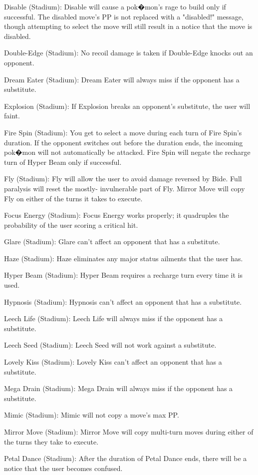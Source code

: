 \documentclass[reprint, aps, prl, paper=A4]{revtex4-1}
\begin{document}
Disable (Stadium):
Disable will cause a pok�mon's rage to build only if successful. The disabled move's PP is not
replaced with a "disabled!" message, though attempting to select the move will still result in
a notice that the move is disabled.

Double-Edge (Stadium):
No recoil damage is taken if Double-Edge knocks out an opponent.

Dream Eater (Stadium):
Dream Eater will always miss if the opponent has a substitute.

Explosion (Stadium):
If Explosion breaks an opponent's substitute, the user will faint.

Fire Spin (Stadium):
You get to select a move during each turn of Fire Spin's duration. If the opponent switches out
before the duration ends, the incoming pok�mon will not automatically be attacked. Fire Spin
will negate the recharge turn of Hyper Beam only if successful.

Fly (Stadium):
Fly will allow the user to avoid damage reversed by Bide. Full paralysis will reset the mostly-
invulnerable part of Fly. Mirror Move will copy Fly on either of the turns it takes to execute.

Focus Energy (Stadium):
Focus Energy works properly; it quadruples the probability of the user scoring a critical hit.

Glare (Stadium):
Glare can't affect an opponent that has a substitute.

Haze (Stadium):
Haze eliminates any major status ailments that the user has.

Hyper Beam (Stadium):
Hyper Beam requires a recharge turn every time it is used.

Hypnosis (Stadium):
Hypnosis can't affect an opponent that has a substitute.

Leech Life (Stadium):
Leech Life will always miss if the opponent has a substitute.

Leech Seed (Stadium):
Leech Seed will not work against a substitute.

Lovely Kiss (Stadium):
Lovely Kiss can't affect an opponent that has a substitute.

Mega Drain (Stadium):
Mega Drain will always miss if the opponent has a substitute.

Mimic (Stadium):
Mimic will not copy a move's max PP.

Mirror Move (Stadium):
Mirror Move will copy multi-turn moves during either of the turns they take to execute.

Petal Dance (Stadium):
After the duration of Petal Dance ends, there will be a notice that the user becomes confused.
\end{document}

